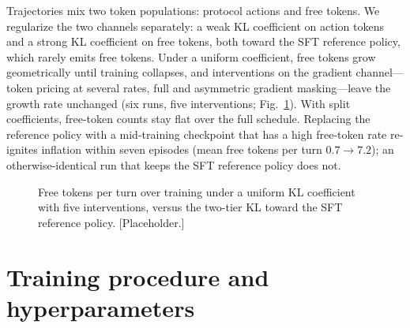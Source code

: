 Trajectories mix two token populations: protocol actions and free
tokens. We regularize the two channels separately: a weak KL
coefficient on action tokens and a strong KL coefficient on free
tokens, both toward the SFT reference policy, which rarely emits free
tokens. Under a uniform coefficient, free tokens grow geometrically
until training collapses, and interventions on the gradient
channel---token pricing at several rates, full and asymmetric gradient
masking---leave the growth rate unchanged (six runs, five
interventions; Fig.~\ref{fig:ftk}). With split
coefficients, free-token counts stay flat over the full schedule.
Replacing the reference policy with a mid-training checkpoint that has
a high free-token rate re-ignites inflation within seven episodes (mean
free tokens per turn $0.7 \rightarrow 7.2$); an otherwise-identical run
that keeps the SFT reference policy does not.

\begin{figure}[t]
\centering
{}
\caption{Free tokens per turn over training under a uniform KL
coefficient with five interventions, versus the two-tier KL toward the
SFT reference policy. [Placeholder.]}
\label{fig:ftk}
\end{figure}

\section{Training procedure and hyperparameters}
\label{app:procedure}
\label{sec:method-algo}

